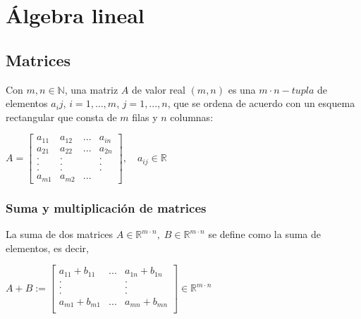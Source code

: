 \chapter{Álgebra lineal}

\section{Matrices}

\begin{tcolorbox}[colframe=white]
    \begin{def.}[Matriz]
	Con $m,n \in \mathbb{N}$, una matriz $A$ de valor real $(m, n)$ es una $m \cdot n-tupla$ de elementos $a_ij$, $i = 1,. . . , m$, $j = 1,. . . , n$, que se ordena de acuerdo con un esquema rectangular que consta de $m$ filas y $n$ columnas:	
	\begin{center}
	    $ A = \begin{bmatrix}
		a_{11} & a_{12} & ... & a_{in}\\
		a_{21} & a_{22} & ... & a_{2n}\\
		. & . &  & . \\ 
		. & . &  & . \\ 
		. & . &  & . \\ 
		a_{m1} & a_{m2} & ... %
	    \end{bmatrix}, \quad a_{ij} \in \mathbb{R}$
	\end{center}
    \end{def.}
\end{tcolorbox}

\subsection{Suma y multiplicación de matrices}

\begin{tcolorbox}[colframe=white]
    \begin{def.}
	La suma de dos matrices $A \in \mathbb{R}^{m\cdot n}, \; B \in \mathbb{R}^{m\cdot n}$ se define como la suma de elementos, es decir,
	\begin{center}
	    $ A +B := \begin{bmatrix}
		a_{11}+b_{11}&...&a_{1n} + b_{1n}\\
		.&&.\\
		.&&.\\
		.&&.\\
		a_{m1} + b_{m1}& ... & a_{mn} + b_{mn}\\
	    \end{bmatrix} \in \mathbb{R}^{m  \cdot n}$
	\end{center}
    \end{def.}
\end{tcolorbox}

